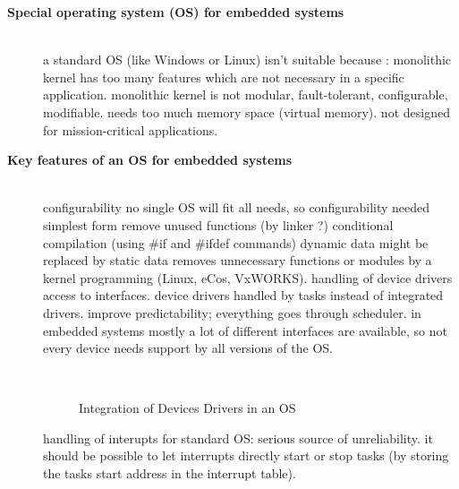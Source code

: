 \begin{description}
\item[{\rot\bf Special operating system (OS) for embedded systems}]~\\[-3ex]
\bigskip
\bi
	\ite a standard OS (like Windows or Linux) isn't suitable because :
	\bi
		\ite monolithic kernel has too many features which are not necessary in a specific application.
		\ite monolithic kernel is not modular, fault-tolerant, configurable, modifiable.
		\ite needs too much memory space (virtual memory).
		\ite not designed for mission-critical applications.	
	\ei
\ei
\bigskip
\item[{\rot\bf Key features of an OS for embedded systems }]~\\[-3ex]
\bigskip
\bi
	\ite configurability \pr no single OS will fit all needs, so configurability needed
	\bi
		\ite simplest form \pr remove unused functions (by linker ?)
		\ite conditional compilation (using \#if and \#ifdef commands)
		\ite dynamic data might be replaced by static data
		\ite removes unnecessary functions or modules by a kernel programming (Linux, eCos, VxWORKS).
	\ei
	\bigskip
	\ite handling of device drivers
	\bi
		\ite access to interfaces.
		\ite device drivers handled by tasks instead of integrated drivers.
		\ite improve predictability; everything goes through scheduler.
  		\ite in embedded systems mostly a lot of different interfaces are available, so not every device needs support by all versions of the OS.
	\ei
\ei

\begin{figure}[!hbtp]
     \begin{center}
	  \\
	  \caption{Integration of Devices Drivers in an OS}
     \end{center}
\end{figure}
\os{\newpage}

\bigskip
\bi
	\ite handling of interupts
	\bi
		\ite for standard OS: serious source of unreliability.
		\ite it should be possible to let interrupts directly start or stop tasks (by storing the tasks start address in the interrupt table).
	\ei
\ei


\end{description}
